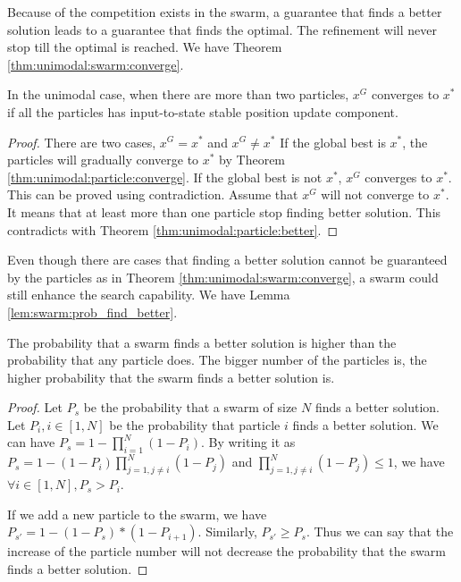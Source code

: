 Because of the competition exists in the swarm, a guarantee that finds a better solution leads to a guarantee that finds the optimal.
The refinement will never stop till the optimal is reached.
We have Theorem \ref{thm:unimodal:swarm:converge}.

\begin{mythm}
\label{thm:unimodal:swarm:converge}
In the unimodal case, when there are more than two particles, $ x^{G} $ converges to $ x^{*} $ if all the particles has input-to-state stable position update component.
\begin{proof}
There are two cases, $ x^{G} = x^{*} $ and $ x^{G} \not = x^{*} $
If the global best is $ x^{*} $, the particles will gradually converge to $ x^{*} $ by Theorem \ref{thm:unimodal:particle:converge}.
If the global best is not $ x^{*} $, $ x^{G} $ converges to $ x^{*} $.
This can be proved using contradiction.
Assume that $ x^{G} $ will not converge to $ x^{*} $.
It means that at least more than one particle stop finding better solution.
This contradicts with Theorem \ref{thm:unimodal:particle:better}.
\end{proof}
\end{mythm}



Even though there are cases that finding a better solution cannot be guaranteed by the particles as in Theorem \ref{thm:unimodal:swarm:converge}, a swarm could still enhance the search capability.
We have Lemma \ref{lem:swarm:prob_find_better}.

\begin{mylem}
\label{lem:swarm:prob_find_better}
The probability that a swarm finds a better solution is higher than the probability that any particle does.
The bigger number of the particles is, the higher probability that the swarm finds a better solution is.
\begin{proof}
Let $ P_{s} $ be the probability that a swarm of size $ N $ finds a better solution.
Let $ P_{i}, i \in [1, N] $ be the probability that particle $ i $ finds a better solution.
We can have  $ P_{s} = 1 - \prod_{i=1}^{N} ( 1 - P_{i} ) $.
By writing it as $ P_{s} = 1 - ( 1 - P_{i} ) \prod_{j=1, j \not = i}^{N}  ( 1 - P_{j} ) $ and $ \prod_{j=1, j \not = i}^{N}  ( 1 - P_{j} ) \leq 1 $, we have $ \forall i \in [1, N], P_{s} > P_{i} $.

If we add a new particle to the swarm, we have
$ P_{s'}  = 1 - (1- P_{s}) *(1-P_{i+1}) $. 
Similarly, $ P_{s'} \geq P_{s} $.
Thus we can say that the increase of the particle number will not decrease the probability that the swarm finds a better solution.
\end{proof}
\end{mylem}

